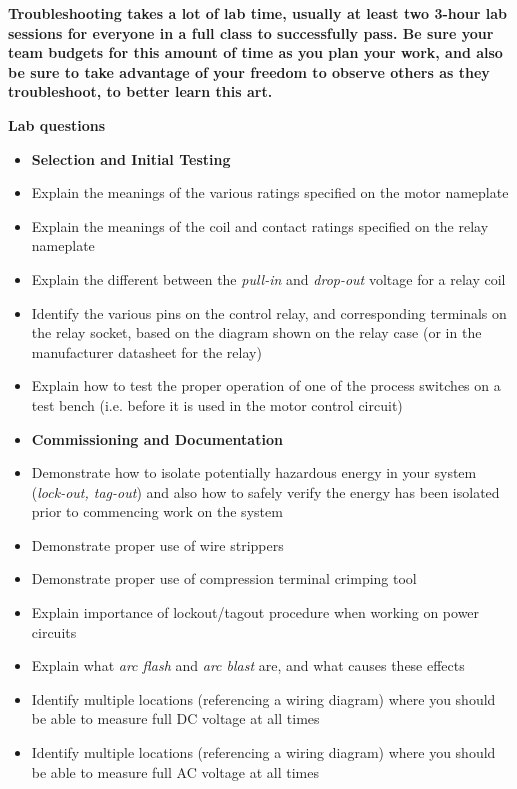 \vskip 10pt

{\bf Troubleshooting takes a lot of lab time, usually at least two 3-hour lab sessions for everyone in a full class to successfully pass.  Be sure your team budgets for this amount of time as you plan your work, and also be sure to take advantage of your freedom to observe others as they troubleshoot, to better learn this art.}




\vfil \eject

\noindent
{\bf Lab questions}

\vskip 5pt

\begin{itemize}
\item{} {\bf Selection and Initial Testing}
\item{} Explain the meanings of the various ratings specified on the motor nameplate
\item{} Explain the meanings of the coil and contact ratings specified on the relay nameplate
\item{} Explain the different between the {\it pull-in} and {\it drop-out} voltage for a relay coil
\item{} Identify the various pins on the control relay, and corresponding terminals on the relay socket, based on the diagram shown on the relay case (or in the manufacturer datasheet for the relay)
\item{} Explain how to test the proper operation of one of the process switches on a test bench (i.e. before it is used in the motor control circuit)
\end{itemize}

\filbreak

\begin{itemize}
\item{} {\bf Commissioning and Documentation}
\item{} Demonstrate how to isolate potentially hazardous energy in your system ({\it lock-out, tag-out}) and also how to safely verify the energy has been isolated prior to commencing work on the system
\item{} Demonstrate proper use of wire strippers
\item{} Demonstrate proper use of compression terminal crimping tool
\item{} Explain importance of lockout/tagout procedure when working on power circuits
\item{} Explain what {\it arc flash} and {\it arc blast} are, and what causes these effects
\item{} Identify multiple locations (referencing a wiring diagram) where you should be able to measure full DC voltage at all times
\item{} Identify multiple locations (referencing a wiring diagram) where you should be able to measure full AC voltage at all times
\end{itemize}

